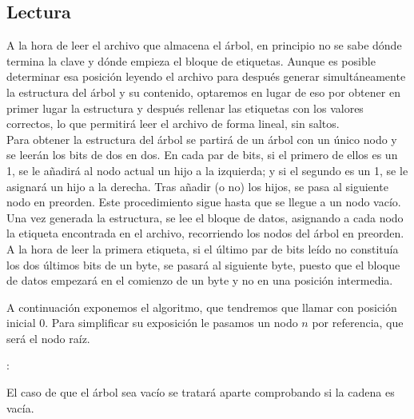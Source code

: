 \documentclass{article}
\newenvironment{algo}{
\vspace*{0.5cm}
\begin{algorithm}[H]}{
\end{algorithm}
\vspace*{0.5cm}
}
\begin{document}
\subsection{Lectura}

A la hora de leer el archivo que almacena el árbol, en principio no se sabe dónde
termina la clave y dónde empieza el bloque de etiquetas. Aunque es posible
determinar esa posición leyendo el archivo para después generar simultáneamente la
estructura del árbol y su contenido, optaremos en lugar de eso por obtener en
primer lugar la estructura y después rellenar las etiquetas con los valores
correctos, lo que permitirá leer el archivo de forma lineal, sin saltos. \\

Para obtener la estructura del árbol se partirá de un árbol con un único nodo y se
leerán los bits de dos en dos. En cada par de bits, si el primero de ellos es un
1, se le añadirá al nodo actual un hijo a la izquierda; y si el segundo es un 1,
se le asignará un hijo a la derecha. Tras añadir (o no) los hijos, se pasa al
siguiente nodo en preorden. Este procedimiento sigue hasta que se llegue a un nodo
vacío. \\

Una vez generada la estructura, se lee el bloque de datos, asignando a cada nodo la
etiqueta encontrada en el archivo, recorriendo los nodos del árbol en preorden. A
la hora de leer la primera etiqueta, si el último par de bits leído no constituía
los dos últimos bits de un byte, se pasará al siguiente byte, puesto que el bloque
de datos empezará en el comienzo de un byte y no en una posición intermedia.

A continuación exponemos el algoritmo, que tendremos que llamar con posición inicial 0.
Para simplificar su exposición le pasamos un nodo $n$ por referencia, que será
el nodo raíz.

\begin{algo}
: \\

\BlankLine


\end{algo}

El caso de que el árbol sea vacío se tratará aparte comprobando si la cadena es
vacía.
\end{document}
